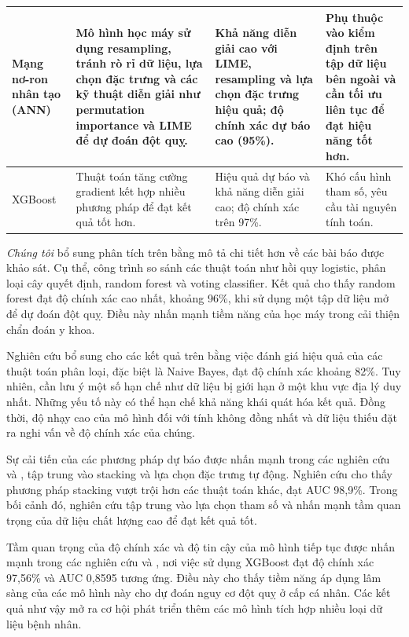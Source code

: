 \begin{longtable}{|L{2.3cm}|L{4.5cm}|L{3.7cm}|L{4.0cm}|}
	Mạng nơ-ron nhân tạo (ANN) &
	Mô hình học máy sử dụng resampling, tránh rò rỉ dữ liệu, lựa chọn đặc trưng và các kỹ thuật diễn giải như permutation importance và LIME để dự đoán đột quỵ. &
	Khả năng diễn giải cao với LIME, resampling và lựa chọn đặc trưng hiệu quả; độ chính xác dự báo cao (95\%). &
	Phụ thuộc vào kiểm định trên tập dữ liệu bên ngoài và cần tối ưu liên tục để đạt hiệu năng tốt hơn.\\
	\hline
	
	XGBoost &
	Thuật toán tăng cường gradient kết hợp nhiều phương pháp để đạt kết quả tốt hơn. &
	Hiệu quả dự báo và khả năng diễn giải cao; độ chính xác trên 97\%. &
	Khó cấu hình tham số, yêu cầu tài nguyên tính toán.\\
	\hline
	
\end{longtable}

\textit{Chúng tôi} bổ sung phân tích trên bằng mô tả chi tiết hơn về các bài báo được khảo sát. Cụ thể, công trình  so sánh các thuật toán như hồi quy logistic, phân loại cây quyết định, random forest và voting classifier. Kết quả cho thấy random forest đạt độ chính xác cao nhất, khoảng 96\%, khi sử dụng một tập dữ liệu mở để dự đoán đột quỵ. Điều này nhấn mạnh tiềm năng của học máy trong cải thiện chẩn đoán y khoa.

Nghiên cứu  bổ sung cho các kết quả trên bằng việc đánh giá hiệu quả của các thuật toán phân loại, đặc biệt là Naive Bayes, đạt độ chính xác khoảng 82\%. Tuy nhiên, cần lưu ý một số hạn chế như dữ liệu bị giới hạn ở một khu vực địa lý duy nhất. Những yếu tố này có thể hạn chế khả năng khái quát hóa kết quả. Đồng thời, độ nhạy cao của mô hình đối với tính không đồng nhất và dữ liệu thiếu đặt ra nghi vấn về độ chính xác của chúng.

Sự cải tiến của các phương pháp dự báo được nhấn mạnh trong các nghiên cứu  và , tập trung vào stacking và lựa chọn đặc trưng tự động. Nghiên cứu  cho thấy phương pháp stacking vượt trội hơn các thuật toán khác, đạt AUC 98,9\%. Trong bối cảnh đó, nghiên cứu  tập trung vào lựa chọn tham số và nhấn mạnh tầm quan trọng của dữ liệu chất lượng cao để đạt kết quả tốt.

Tầm quan trọng của độ chính xác và độ tin cậy của mô hình tiếp tục được nhấn mạnh trong các nghiên cứu  và , nơi việc sử dụng XGBoost đạt độ chính xác 97,56\% và AUC 0,8595 tương ứng. Điều này cho thấy tiềm năng áp dụng lâm sàng của các mô hình này cho dự đoán nguy cơ đột quỵ ở cấp cá nhân. Các kết quả như vậy mở ra cơ hội phát triển thêm các mô hình tích hợp nhiều loại dữ liệu bệnh nhân.

